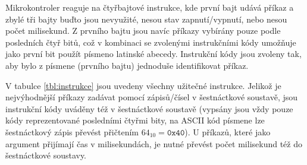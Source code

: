 \documentclass[twoside,project]{../MFFPrace}
\begin{document}
\medskip

Mikrokontroler reaguje na čtyřbajtové instrukce, kde první bajt udává příkaz a zbylé tři bajty buďto jsou nevyužité, nesou stav zapnutí/vypnutí, nebo nesou počet milisekund. Z prvního bajtu jsou navíc příkazy vybírány pouze podle posledních čtyř bitů, což v kombinaci se zvolenými instrukčními kódy umožňuje jako první bit použít písmeno latinské abecedy. Instrukční kódy jsou zvoleny tak, aby bylo z písmene (prvního bajtu) jednoduše identifikovat příkaz.

V tabulce \ref{tbl:instrukce} jsou uvedeny všechny užitečné instrukce. Jelikož je nejvýhodnější příkazy zadávat pomocí zápisů/čísel v šestnáctkové soustavě, jsou instrukční kódy uváděny též v šestnáctkové soustavě (vypsány jsou vždy pouze kódy reprezentované posledními čtyřmi bity, na ASCII kód písmene lze šestnáctkový zápis převést přičtením $64_{10}=\mathtt{0x40}$). U příkazů, které jako argument přijímají čas v milisekundách, je nutné převést počet milisekund též do šestnáctkové soustavy.
\end{document}
